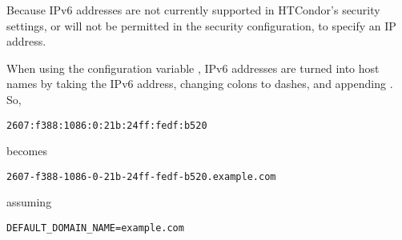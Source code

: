 Because IPv6 addresses are not currently supported in HTCondor's 
security settings, 
 or  will not
be permitted in the security configuration, 
to specify an IP address.

When using the configuration variable ,
IPv6 addresses are turned into host names by taking the IPv6 address, 
changing colons to dashes, and appending . 
So, 
\begin{verbatim}
2607:f388:1086:0:21b:24ff:fedf:b520
\end{verbatim}
becomes 
\begin{verbatim}
2607-f388-1086-0-21b-24ff-fedf-b520.example.com 
\end{verbatim}
assuming
\begin{verbatim}
DEFAULT_DOMAIN_NAME=example.com
\end{verbatim}

